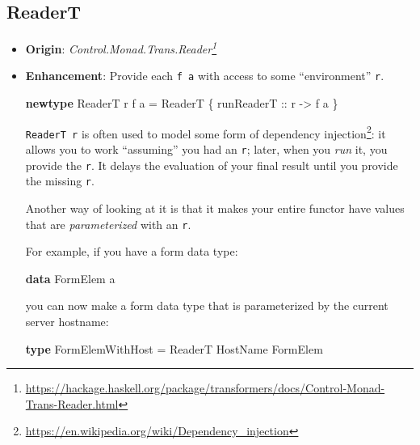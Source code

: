 \documentclass[]{article}
\newenvironment{Shaded}{}{}
\newcommand{\DataTypeTok}[1]{\textcolor[rgb]{0.56,0.13,0.00}{#1}}
\newcommand{\KeywordTok}[1]{\textcolor[rgb]{0.00,0.44,0.13}{\textbf{#1}}}
\newcommand{\NormalTok}[1]{#1}
\newcommand{\OtherTok}[1]{\textcolor[rgb]{0.00,0.44,0.13}{#1}}
\renewcommand{\href}[2]{#2\footnote{\url{#1}}}
\begin{document}
\hypertarget{readert}{%
\subsection{ReaderT}\label{readert}}

\begin{itemize}
\item
  \textbf{Origin}:
  \emph{\href{https://hackage.haskell.org/package/transformers/docs/Control-Monad-Trans-Reader.html}{Control.Monad.Trans.Reader}}
\item
  \textbf{Enhancement}: Provide each \texttt{f\ a} with access to some
  ``environment'' \texttt{r}.

\begin{Shaded}
\begin{Highlighting}[]
\KeywordTok{newtype} \DataTypeTok{ReaderT}\NormalTok{ r f a }\OtherTok{=} \DataTypeTok{ReaderT}\NormalTok{ \{}\OtherTok{ runReaderT ::}\NormalTok{ r }\OtherTok{{-}>}\NormalTok{ f a \}}
\end{Highlighting}
\end{Shaded}

  \texttt{ReaderT\ r} is often used to model some form of
  \href{https://en.wikipedia.org/wiki/Dependency_injection}{dependency
  injection}: it allows you to work ``assuming'' you had an \texttt{r}; later,
  when you \emph{run} it, you provide the \texttt{r}. It delays the evaluation
  of your final result until you provide the missing \texttt{r}.

  Another way of looking at it is that it makes your entire functor have values
  that are \emph{parameterized} with an \texttt{r}.

  For example, if you have a form data type:

\begin{Shaded}
\begin{Highlighting}[]
\KeywordTok{data} \DataTypeTok{FormElem}\NormalTok{ a}
\end{Highlighting}
\end{Shaded}

  you can now make a form data type that is parameterized by the current server
  hostname:

\begin{Shaded}
\begin{Highlighting}[]
\KeywordTok{type} \DataTypeTok{FormElemWithHost} \OtherTok{=} \DataTypeTok{ReaderT} \DataTypeTok{HostName} \DataTypeTok{FormElem}
\end{Highlighting}
\end{Shaded}


\end{itemize}
\end{document}
